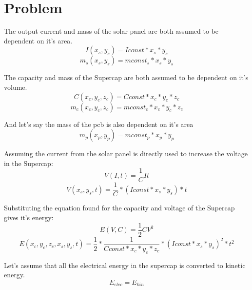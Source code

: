 \documentclass[../MainPaper.tex]{subfiles}
\begin{document}
\section{Problem}

The output current and mass of the solar panel are both assumed to be dependent on it's area.
\begin{equation}
	I(x_s, y_s) = Iconst * x_s * y_s
\end{equation}
\begin{equation}
	m_s(x_s, y_s) = mconst_s * x_s * y_s
\end{equation}

\noindent The capacity and mass of the Supercap are both assumed to be dependent on it's volume.
\begin{equation}
	C(x_c, y_c, z_c) = Cconst * x_c * y_c * z_c
\end{equation}
\begin{equation}
	m_c(x_c, y_c, z_c) = mconst_c * x_c * y_c * z_c
\end{equation}

\noindent And let's say the mass of the pcb is also dependent on it's area
\begin{equation}
	m_p(x_p, y_p) = mconst_p * x_p * y_p
\end{equation}

\noindent Assuming the current from the solar panel is directly used to increase the voltage in the Supercap:
\begin{equation}
	V(I, t) = \frac{1}{C} I t
\end{equation}
\begin{equation}
	V(x_s, y_s, t) = \frac{1}{C} * ( Iconst * x_s * y_s ) * t 
\end{equation}

\noindent Substituting the equation found for the capacity and voltage of the Supercap gives it's energy:
\begin{equation}
	E(V, C) = \frac{1}{2} C V^2
\end{equation}
\begin{equation}
	E(x_c, y_c, z_c, x_s, y_s, t) = \frac{1}{2} * \frac{1}{Cconst * x_c * y_c * z_c} * (Iconst * x_s * y_s)^2 * t^2
\end{equation}

\noindent Let's assume that all the electrical energy in the supercap is converted to kinetic energy.
\begin{equation}
	E_{elec} = E_{kin}
\end{equation}
\end{document}
